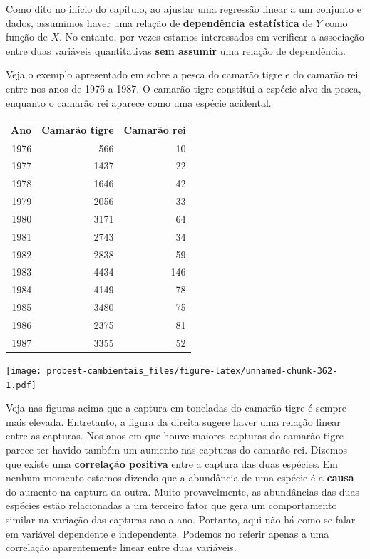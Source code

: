 \documentclass[
]{book}
\begin{document}
Como dito no início do capítulo, ao ajustar uma regressão linear a um conjunto e dados, assumimos haver uma relação de \textbf{dependência estatística} de \(Y\) como função de \(X\). No entanto, por vezes estamos interessados em verificar a associação entre duas variáveis quantitativas \textbf{sem assumir} uma relação de dependência.

Veja o exemplo apresentado em \citep{haddon2010modelling} sobre a pesca do camarão tigre e do camarão rei entre nos anos de 1976 a 1987. O camarão tigre constitui a espécie alvo da pesca, enquanto o camarão rei aparece como uma espécie acidental.

\begin{tabular}{r|r|r}
\hline
Ano & Camarão tigre & Camarão rei\\
\hline
1976 & 566 & 10\\
\hline
1977 & 1437 & 22\\
\hline
1978 & 1646 & 42\\
\hline
1979 & 2056 & 33\\
\hline
1980 & 3171 & 64\\
\hline
1981 & 2743 & 34\\
\hline
1982 & 2838 & 59\\
\hline
1983 & 4434 & 146\\
\hline
1984 & 4149 & 78\\
\hline
1985 & 3480 & 75\\
\hline
1986 & 2375 & 81\\
\hline
1987 & 3355 & 52\\
\hline
\end{tabular}

\texttt{[image: probest-cambientais\_files/figure-latex/unnamed-chunk-362-1.pdf]}

Veja nas figuras acima que a captura em toneladas do camarão tigre é sempre mais elevada. Entretanto, a figura da direita sugere haver uma relação linear entre as capturas. Nos anos em que houve maiores capturas do camarão tigre parece ter havido também um aumento nas capturas do camarão rei. Dizemos que existe uma \textbf{correlação positiva} entre a captura das duas espécies. Em nenhum momento estamos dizendo que a abundância de uma espécie é a \textbf{causa} do aumento na captura da outra. Muito provavelmente, as abundâncias das duas espécies estão relacionadas a um terceiro fator que gera um comportamento similar na variação das capturas ano a ano. Portanto, aqui não há como se falar em variável dependente e independente. Podemos no referir apenas a uma correlação aparentemente linear entre duas variáveis.
\end{document}
